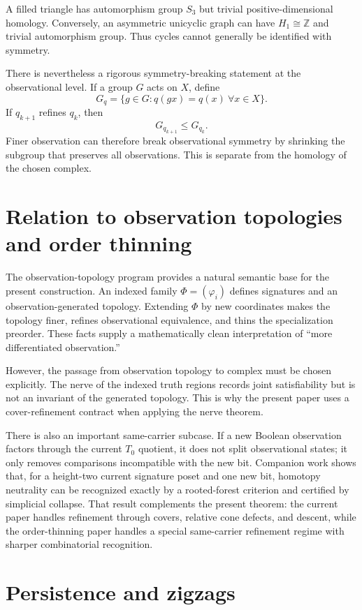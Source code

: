 \documentclass[11pt]{article}
\begin{document}
A filled triangle has automorphism group $S_3$ but trivial positive-dimensional homology.  Conversely, an asymmetric unicyclic graph can have $H_1\cong\mathbb Z$ and trivial automorphism group.  Thus cycles cannot generally be identified with symmetry.

There is nevertheless a rigorous symmetry-breaking statement at the observational level.  If a group $G$ acts on $X$, define
\[
G_q=\{g\in G:q(gx)=q(x)\ \forall x\in X\}.
\]
If $q_{k+1}$ refines $q_k$, then
\[
G_{q_{k+1}}\le G_{q_k}.
\]
Finer observation can therefore break observational symmetry by shrinking the subgroup that preserves all observations.  This is separate from the homology of the chosen complex.

\section{Relation to observation topologies and order thinning}

The observation-topology program provides a natural semantic base for the present construction.  An indexed family $\Phi=(\varphi_i)$ defines signatures and an observation-generated topology.  Extending $\Phi$ by new coordinates makes the topology finer, refines observational equivalence, and thins the specialization preorder.  These facts supply a mathematically clean interpretation of ``more differentiated observation.''

However, the passage from observation topology to complex must be chosen explicitly.  The nerve of the indexed truth regions records joint satisfiability but is not an invariant of the generated topology.  This is why the present paper uses a cover-refinement contract when applying the nerve theorem.

There is also an important same-carrier subcase.  If a new Boolean observation factors through the current $T_0$ quotient, it does not split observational states; it only removes comparisons incompatible with the new bit.  Companion work shows that, for a height-two current signature poset and one new bit, homotopy neutrality can be recognized exactly by a rooted-forest criterion and certified by simplicial collapse.  That result complements the present theorem: the current paper handles refinement through covers, relative cone defects, and descent, while the order-thinning paper handles a special same-carrier refinement regime with sharper combinatorial recognition.

\section{Persistence and zigzags}
\end{document}
